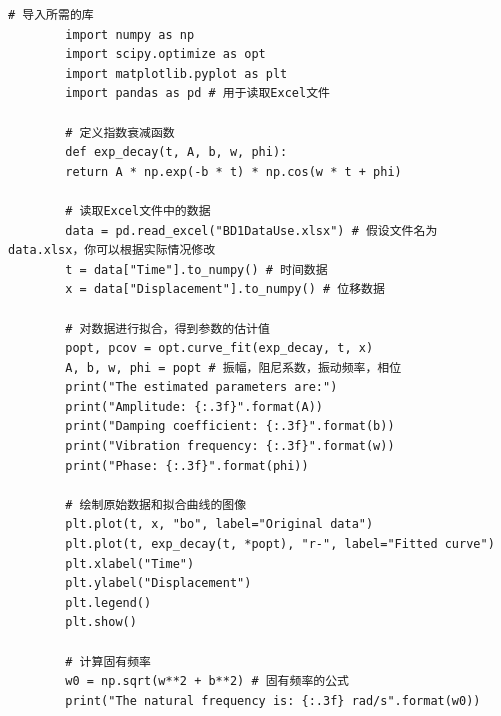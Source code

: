\documentclass[dvipsnames, svgnames,a4paper,11pt]{article}
\begin{document}
	\begin{lstlisting}[style=pythonstyle,caption=代码记录（Python：思考题中的拟合）]
		# 导入所需的库
		import numpy as np
		import scipy.optimize as opt
		import matplotlib.pyplot as plt
		import pandas as pd # 用于读取Excel文件
		
		# 定义指数衰减函数
		def exp_decay(t, A, b, w, phi):
		return A * np.exp(-b * t) * np.cos(w * t + phi)
		
		# 读取Excel文件中的数据
		data = pd.read_excel("BD1DataUse.xlsx") # 假设文件名为data.xlsx，你可以根据实际情况修改
		t = data["Time"].to_numpy() # 时间数据
		x = data["Displacement"].to_numpy() # 位移数据
		
		# 对数据进行拟合，得到参数的估计值
		popt, pcov = opt.curve_fit(exp_decay, t, x)
		A, b, w, phi = popt # 振幅，阻尼系数，振动频率，相位
		print("The estimated parameters are:")
		print("Amplitude: {:.3f}".format(A))
		print("Damping coefficient: {:.3f}".format(b))
		print("Vibration frequency: {:.3f}".format(w))
		print("Phase: {:.3f}".format(phi))
		
		# 绘制原始数据和拟合曲线的图像
		plt.plot(t, x, "bo", label="Original data")
		plt.plot(t, exp_decay(t, *popt), "r-", label="Fitted curve")
		plt.xlabel("Time")
		plt.ylabel("Displacement")
		plt.legend()
		plt.show()
		
		# 计算固有频率
		w0 = np.sqrt(w**2 + b**2) # 固有频率的公式
		print("The natural frequency is: {:.3f} rad/s".format(w0))
	\end{lstlisting}
	
	
\end{document}
